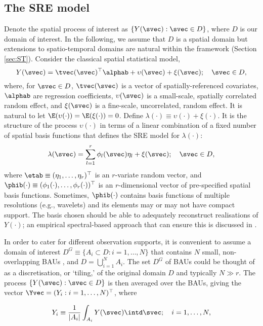 \subsection{The SRE model} \label{sec:SREModel}

Denote the spatial process of interest as $\{Y(\svec) : \svec \in D\}$, where $D$ is our domain of interest. In the following, we assume that $D$ is a spatial domain but extensions to spatio-temporal domains are natural within the framework (Section \ref{sec:ST}). Consider the classical spatial statistical model,
\begin{equation*}
Y(\svec) = \tvec(\svec)^\top\alphab + \upsilon(\svec) + \xi(\svec); \quad \svec \in D,
\end{equation*}
where, for $\svec \in D$, $\tvec(\svec)$ is a vector of spatially-referenced covariates, $\alphab$ are regression coefficients, $\upsilon(\svec)$ is a small-scale, spatially correlated random effect, and $\xi(\svec)$ is a fine-scale, uncorrelated, random effect. It is natural to let $\E(\upsilon(\cdot)) = \E(\xi(\cdot)) = 0$. Define $\lambda(\cdot) \equiv \upsilon(\cdot) + \xi(\cdot)$. It is the structure of the process $\upsilon(\cdot)$ in terms of a linear combination of a fixed number of spatial basis functions that defines the SRE model for $\lambda(\cdot)$:
$$
\lambda(\svec) = \sum_{l=1}^r \phi_l(\svec)\eta_l + \xi(\svec);\quad \svec \in D,
$$
\noindent where $\etab \equiv (\eta_1,\dots,\eta_r)^\top$ is an $r$-variate random vector, and $\phib(\cdot) \equiv (\phi_1(\cdot),\dots,\phi_r(\cdot))^\top$ is an $r$-dimensional vector of pre-specified spatial basis functions. Sometimes, $\phib(\cdot)$ contains basis functions of multiple resolutions (e.g., wavelets) and its elements may or may not have compact support. The basis chosen should be able to adequately reconstruct realisations of $Y(\cdot)$; an empirical spectral-based approach that can ensure this is discussed in \cite{Zammit_2012}.

In order to cater for different observation supports, it is convenient to assume a domain of interest $D^G \equiv \{A_i \subset D: i = 1,\dots,N\}$ that contains $N$ small, non-overlapping BAUs \citep{Nguyen_2012}, and $D = \bigcup_{i=1}^N A_i$. The set $D^G$ of BAUs could be thought of as a discretisation, or `tiling,' of the original domain $D$ and typically $N \gg r$. The process $\{Y(\svec): \svec \in D\}$ is then averaged over the BAUs, giving the vector $\Yvec = (Y_i : i = 1,\dots,N)^\top$, where

\begin{equation}\label{eq:Yi0}
Y_i \equiv \frac{1}{|A_i|}\int_{A_i} Y(\svec) \intd \svec; \quad i = 1,\dots,N,
\end{equation}

